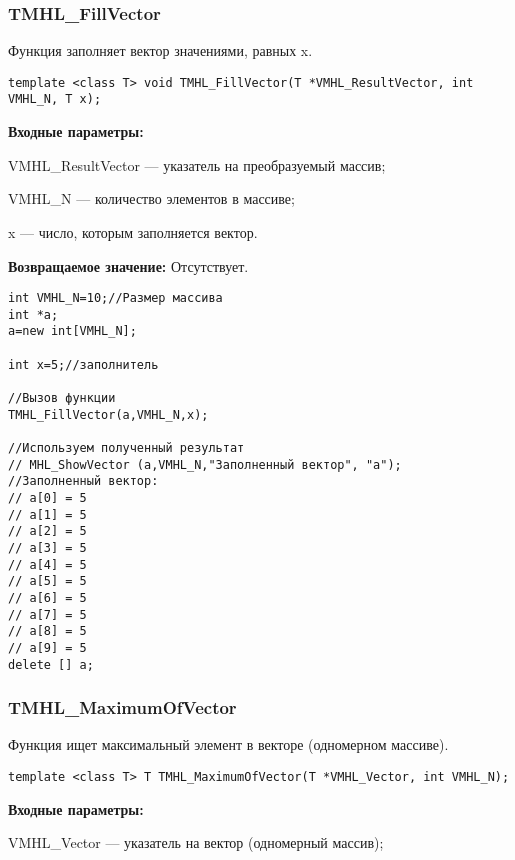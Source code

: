 \documentclass[a4paper,12pt]{article}
\begin{document}
\subsubsection{TMHL\_FillVector}\label{TMHL_FillVector}

Функция заполняет вектор значениями, равных x.


\begin{lstlisting}[label=code_syntax_TMHL_FillVector,caption=Синтаксис]
template <class T> void TMHL_FillVector(T *VMHL_ResultVector, int VMHL_N, T x);
\end{lstlisting}

\textbf{Входные параметры:}

 VMHL\_ResultVector --- указатель на преобразуемый массив;
 
 VMHL\_N --- количество элементов в массиве;
 
 x --- число, которым заполняется вектор.

\textbf{Возвращаемое значение:}
Отсутствует.


\begin{lstlisting}[label=code_use_TMHL_FillVector,caption=Пример использования]
int VMHL_N=10;//Размер массива
int *a;
a=new int[VMHL_N];

int x=5;//заполнитель

//Вызов функции
TMHL_FillVector(a,VMHL_N,x);

//Используем полученный результат
// MHL_ShowVector (a,VMHL_N,"Заполненный вектор", "a");
//Заполненный вектор:
// a[0] = 5
// a[1] = 5
// a[2] = 5
// a[3] = 5
// a[4] = 5
// a[5] = 5
// a[6] = 5
// a[7] = 5
// a[8] = 5
// a[9] = 5
delete [] a;
\end{lstlisting}

\subsubsection{TMHL\_MaximumOfVector}\label{TMHL_MaximumOfVector}

Функция ищет максимальный элемент в векторе (одномерном массиве).


\begin{lstlisting}[label=code_syntax_TMHL_MaximumOfVector,caption=Синтаксис]
template <class T> T TMHL_MaximumOfVector(T *VMHL_Vector, int VMHL_N);
\end{lstlisting}

\textbf{Входные параметры:}

 VMHL\_Vector --- указатель на вектор (одномерный массив);
 
\end{document}
